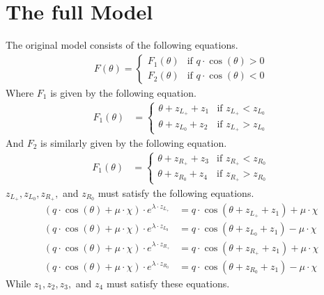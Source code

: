\section{The full Model}

The original model consists of the following equations.
\begin{align}
    F(\theta) = \begin{cases}
        F_1(\theta) & \text{if } q \cdot \cos(\theta) > 0 \\
        F_2(\theta) & \text{if } q \cdot \cos(\theta) < 0
    \end{cases}
\end{align}
Where $F_1$ is given by the following equation.
\begin{align}
    F_1(\theta) & = \begin{cases}
        \theta + z_{L_+} + z_1 & \text{if } z_{L_+} < z_{L_0} \\
        \theta + z_{L_0} + z_2 & \text{if } z_{L_+} > z_{L_0}
    \end{cases}
\end{align}
And $F_2$ is similarly given by the following equation.
\begin{align}
    F_1(\theta) & = \begin{cases}
        \theta + z_{R_+} + z_3 & \text{if } z_{R_+} < z_{R_0} \\
        \theta + z_{R_0} + z_4 & \text{if } z_{R_+} > z_{R_0}
    \end{cases}
\end{align}
$z_{L_+}, z_{L_0}, z_{R_+},$ and $z_{R_0}$ must satisfy the following equations.
\begin{subequations}
\begin{align}
    (q \cdot \cos(\theta) + \mu \cdot \chi) \cdot e^{\lambda \cdot z_{L_+}}
    & = q \cdot \cos(\theta + z_{L_+} + z_1) + \mu \cdot \chi \\
    (q \cdot \cos(\theta) + \mu \cdot \chi) \cdot e^{\lambda \cdot z_{L_0}}
    & = q \cdot \cos(\theta + z_{L_0} + z_1) - \mu \cdot \chi \\
    (q \cdot \cos(\theta) + \mu \cdot \chi) \cdot e^{\lambda \cdot z_{R_+}}
    & = q \cdot \cos(\theta + z_{R_+} + z_1) + \mu \cdot \chi \\
    (q \cdot \cos(\theta) + \mu \cdot \chi) \cdot e^{\lambda \cdot z_{R_0}}
    & = q \cdot \cos(\theta + z_{R_0} + z_1) - \mu \cdot \chi
\end{align}
\end{subequations}
While $z_1, z_2, z_3,$ and $z_4$ must satisfy these equations.
